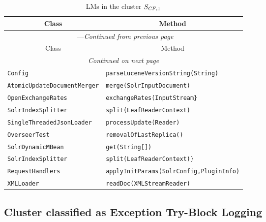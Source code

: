 \begin{center}
\begin{longtable}{ll}
\caption{LMs in the cluster $\mathit{S}_{\mathit{CF},1}$}\\
\toprule\multicolumn{1}{c}{Class}&\multicolumn{1}{c}{Method}\\\midrule
\endfirsthead

\multicolumn{2}{c}{\tablename\ \thetable{}---\textit{Continued from previous page}} \\\midrule
\multicolumn{1}{c}{Class}&\multicolumn{1}{c}{Method}\\\midrule
\endhead
\multicolumn{2}{c}{\textit{Continued on next page}}\\\midrule
\endfoot
\bottomrule
\endlastfoot

\lstinline/Config/&{\lstinline/parseLuceneVersionString(String)/}\\
\lstinline/AtomicUpdateDocumentMerger/&{\lstinline/merge(SolrInputDocument)/}\\
\lstinline/OpenExchangeRates/&{\lstinline/exchangeRates(InputStream}/}\\
\lstinline/SolrIndexSplitter/&{\lstinline/split(LeafReaderContext)/}\\
\lstinline/SingleThreadedJsonLoader/&{\lstinline/processUpdate(Reader)/}\\
\lstinline/OverseerTest/&{\lstinline/removalOfLastReplica()/}\\
\lstinline/SolrDynamicMBean/&{\lstinline/get(String[])/}\\
\lstinline/SolrIndexSplitter/&{\lstinline/split(LeafReaderContext)}/}\\
\lstinline/RequestHandlers/&{\lstinline/applyInitParams(SolrConfig,PluginInfo)/}\\
\lstinline/XMLLoader/&{\lstinline/readDoc(XMLStreamReader)/}\\

\end{longtable}
\end{center}

\subsection{Cluster classified as Exception Try-Block Logging}

